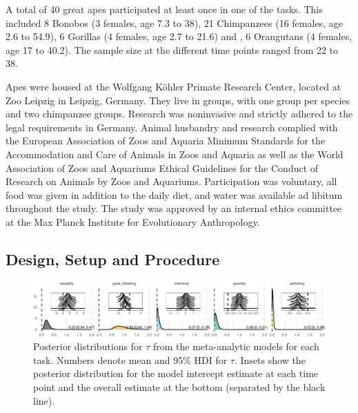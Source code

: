 \documentclass[10pt, letterpaper]{article}
\newenvironment{CodeChunk}{}{}
\begin{document}
A total of 40 great apes participated at least once in one of the tasks.
This included 8 Bonobos (3 females, age 7.3 to 38), 21 Chimpanzees (16
females, age 2.6 to 54.9), 6 Gorillas (4 females, age 2.7 to 21.6) and ,
6 Orangutans (4 females, age 17 to 40.2). The sample size at the
different time points ranged from 22 to 38.

Apes were housed at the Wolfgang Köhler Primate Research Center, located
at Zoo Leipzig in Leipzig, Germany. They live in groups, with one group
per species and two chimpanzee groups. Research was noninvasive and
strictly adhered to the legal requirements in Germany. Animal husbandry
and research complied with the European Association of Zoos and Aquaria
Minimum Standards for the Accommodation and Care of Animals in Zoos and
Aquaria as well as the World Association of Zoos and Aquariums Ethical
Guidelines for the Conduct of Research on Animals by Zoos and Aquariums.
Participation was voluntary, all food was given in addition to the daily
diet, and water was available ad libitum throughout the study. The study
was approved by an internal ethics committee at the Max Planck Institute
for Evolutionary Anthropology.

\hypertarget{design-setup-and-procedure}{%
\subsection{Design, Setup and
Procedure}\label{design-setup-and-procedure}}

\begin{CodeChunk}
\begin{figure}[h]

{\centering \includegraphics{figs/metaplot-1} 

}

\caption[Posterior distributions for $\tau$ from the meta-analytic models for each task]{Posterior distributions for $\tau$ from the meta-analytic models for each task. Numbers denote mean and 95\% HDI for $\tau$. Insets show the posterior distribution for the model intercept estimate at each time point and the overall estimate at the bottom (separated by the black line).}\label{fig:metaplot}
\end{figure}
\end{CodeChunk}
\end{document}
